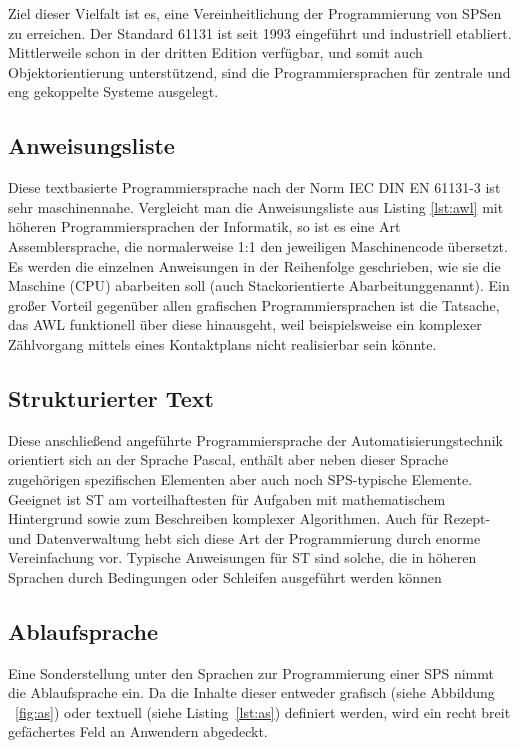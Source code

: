 	Ziel dieser Vielfalt ist es, eine Vereinheitlichung der Programmierung von \ac{SPS}en zu erreichen. Der Standard 61131 ist seit 1993 eingeführt und industriell etabliert. Mittlerweile schon in der dritten Edition verfügbar, und somit auch Objektorientierung unterstützend, sind die Programmiersprachen für zentrale und eng gekoppelte Systeme ausgelegt.
	
	\subsection{Anweisungsliste}
	Diese textbasierte Programmiersprache nach der Norm \acs{IEC} \acs{DIN} \acs{EN} 61131-3 ist sehr maschinennahe. Vergleicht man die Anweisungsliste aus Listing \ref{lst:awl} mit höheren Programmiersprachen der Informatik, so ist es eine Art Assemblersprache, die normalerweise 1:1 den jeweiligen Maschinencode übersetzt. Es werden die einzelnen Anweisungen in der Reihenfolge geschrieben, wie sie die Maschine (\ac{CPU}) abarbeiten soll (auch \glqq Stackorientierte Abarbeitung\grqq \space genannt). Ein großer Vorteil gegenüber allen grafischen Programmiersprachen ist die Tatsache, das AWL funktionell über diese hinausgeht, weil beispielsweise ein komplexer Zählvorgang mittels eines Kontaktplans nicht realisierbar sein könnte. \cite{spslehrgang_struktur, egroetsch_sps}

	

	\subsection{Strukturierter Text}
	Diese anschließend angeführte Programmiersprache der Automatisierungstechnik orientiert sich an der Sprache Pascal, enthält aber neben dieser Sprache zugehörigen spezifischen Elementen aber auch noch \ac{SPS}-typische Elemente. Geeignet ist \ac{ST} am vorteilhaftesten für Aufgaben mit mathematischem Hintergrund sowie zum Beschreiben komplexer Algorithmen. Auch für Rezept- und Datenverwaltung hebt sich diese Art der Programmierung durch enorme Vereinfachung vor. Typische Anweisungen für ST sind solche, die in höheren Sprachen durch Bedingungen oder Schleifen ausgeführt werden können \cite{grundlagen_automatisierungstechnik}
	
	
	
	\subsection{Ablaufsprache}
	Eine Sonderstellung unter den Sprachen zur Programmierung einer \ac{SPS} nimmt die Ablaufsprache ein. Da die Inhalte dieser entweder grafisch (siehe Abbildung ~\ref{fig:as}) oder textuell (siehe Listing~\ref{lst:as}) definiert werden, wird ein recht breit gefächertes Feld an Anwendern abgedeckt.\\

